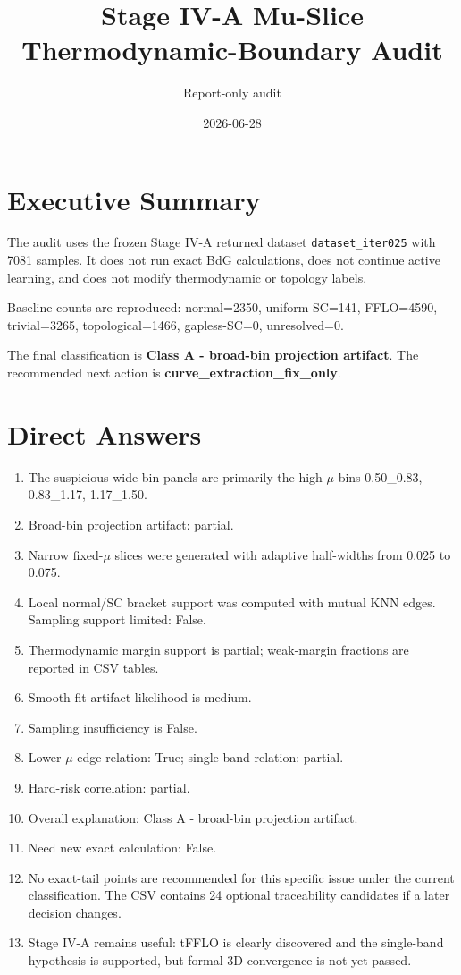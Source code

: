 \documentclass[11pt]{article}
\begin{document}
\title{Stage IV-A Mu-Slice Thermodynamic-Boundary Audit}
\author{Report-only audit}
\date{2026-06-28}
\maketitle
\section*{Executive Summary}
The audit uses the frozen Stage IV-A returned dataset \texttt{dataset\_iter025} with 7081 samples. It does not run exact BdG calculations, does not continue active learning, and does not modify thermodynamic or topology labels.

Baseline counts are reproduced: normal=2350, uniform-SC=141, FFLO=4590, trivial=3265, topological=1466, gapless-SC=0, unresolved=0.

The final classification is \textbf{Class A - broad-bin projection artifact}. The recommended next action is \textbf{curve\_extraction\_fix\_only}.

\section*{Direct Answers}
\begin{enumerate}
\item The suspicious wide-bin panels are primarily the high-\(\mu\) bins 0.50\_0.83, 0.83\_1.17, 1.17\_1.50.
\item Broad-bin projection artifact: partial.
\item Narrow fixed-\(\mu\) slices were generated with adaptive half-widths from 0.025 to 0.075.
\item Local normal/SC bracket support was computed with mutual KNN edges. Sampling support limited: False.
\item Thermodynamic margin support is partial; weak-margin fractions are reported in CSV tables.
\item Smooth-fit artifact likelihood is medium.
\item Sampling insufficiency is False.
\item Lower-\(\mu\) edge relation: True; single-band relation: partial.
\item Hard-risk correlation: partial.
\item Overall explanation: Class A - broad-bin projection artifact.
\item Need new exact calculation: False.
\item No exact-tail points are recommended for this specific issue under the current classification. The CSV contains 24 optional traceability candidates if a later decision changes.
\item Stage IV-A remains useful: tFFLO is clearly discovered and the single-band hypothesis is supported, but formal 3D convergence is not yet passed.
\end{enumerate}
\end{document}
